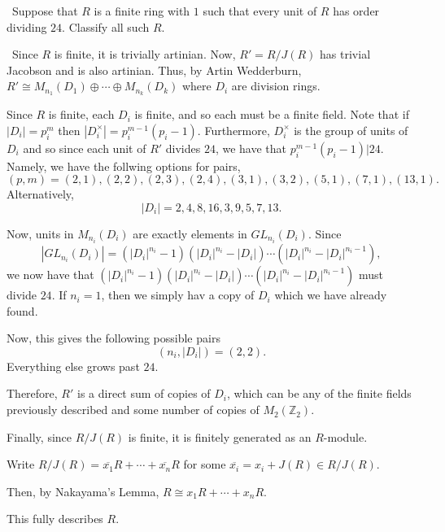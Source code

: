 \documentclass[12pt]{AlgebraQual}
\begin{document}
\begin{problem} $\,$
Suppose that $R$ is a finite ring with $1$ such that every unit of $R$ has order dividing $24$. Classify all such $R$.
\end{problem}



\begin{solution}$\,$
Since $R$ is finite, it is trivially artinian. Now, $R'=R/J(R)$ has trivial Jacobson and is also artinian. Thus, by Artin Wedderburn, $R'\cong M_{n_1}(D_1)\oplus\cdots\oplus M_{n_k}(D_k)$ where $D_i$ are division rings.

Since $R$ is finite, each $D_i$ is finite, and so each must be a finite field. Note that if $|D_i|=p_i^m$ then $|D_i^\times|=p_i^{m-1}(p_i-1)$. Furthermore, $D_i^\times$ is the group of units of $D_i$ and so since each unit of $R'$ divides $24$, we have that $p_i^{m-1}(p_i-1)|24$. Namely, we have the follwing options for pairs, $$(p,m)=(2,1),(2,2),(2,3),(2,4),(3,1),(3,2),(5,1),(7,1),(13,1).$$ Alternatively, $$|D_i|=2,4,8,16,3,9,5,7,13.$$

Now, units in $M_{n_i}(D_i)$ are exactly elements in $GL_{n_i}(D_i)$. Since $$|GL_{n_i}(D_i)|=(|D_i|^{n_i}-1)(|D_i|^{n_i}-|D_i|)\cdots(|D_i|^{n_i}-|D_i|^{n_i-1}),$$ we now have that $(|D_i|^{n_i}-1)(|D_i|^{n_i}-|D_i|)\cdots(|D_i|^{n_i}-|D_i|^{n_i-1})$ must divide $24$. If $n_i=1$, then we simply hav a copy of $D_i$ which we have already found.

Now, this gives the following possible pairs $$(n_i,|D_i|)=(2,2).$$ Everything else grows past $24$.

Therefore, $R'$ is a direct sum of copies of $D_i$, which can be any of the finite fields previously described and some number of copies of $M_2(\mathbb{Z}_2)$.

Finally, since $R/J(R)$ is finite, it is finitely generated as an $R$-module.

Write $R/J(R)=\overline{x_1}R+\cdots+\overline{x_n}R$ for some $\overline{x_i}=x_i+J(R)\in R/J(R)$.

Then, by Nakayama's Lemma, $R\cong x_1R+\cdots+x_nR$.

This fully describes $R.$
\end{solution}
\newpage
\end{document}
